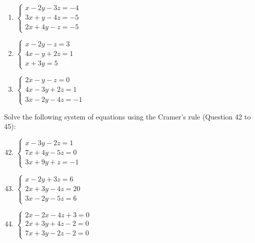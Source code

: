 \documentclass{report}
\begin{document}
\begin{multicols}{2}
\begin{enumerate}[wide, labelwidth=!, labelindent=0pt]
        \item $\begin{cases}
                      x - 2y - 3z = -4 \\
                      3x + y - 4z = -5 \\
                      2x + 4y - z = -5
                  \end{cases}$

        \item $\begin{cases}
                      x - 2y - z = 3  \\
                      4x - y + 2z = 1 \\
                      x + 3y = 5
                  \end{cases}$

        \item $\begin{cases}
                      2x - y - z = 0   \\
                      4x - 3y + 2z = 1 \\
                      3x - 2y - 4z = -1
                  \end{cases}$

    \end{enumerate}

    \noindent Solve the following system of equations using the Cramer's rule (Question 42 to 45):

    \begin{enumerate}[wide, labelwidth=!, labelindent=0pt]
        \setcounter{enumi}{41}

        \item $\begin{cases}
                      x - 3y - 2z = 1  \\
                      7x + 4y - 5z = 0 \\
                      3x + 9y + z = -1
                  \end{cases}$

        \item $\begin{cases}
                      x - 2y + 3z = 6   \\
                      2x + 3y - 4z = 20 \\
                      3x - 2y - 5z = 6
                  \end{cases}$

        \item $\begin{cases}
                      2x - 2x - 4z + 3 = 0 \\
                      2x + 3y + 4z - 2 = 0 \\
                      7x + 3y - 2z - 2 = 0
                  \end{cases}$


\end{enumerate}
\end{multicols}
\end{document}
